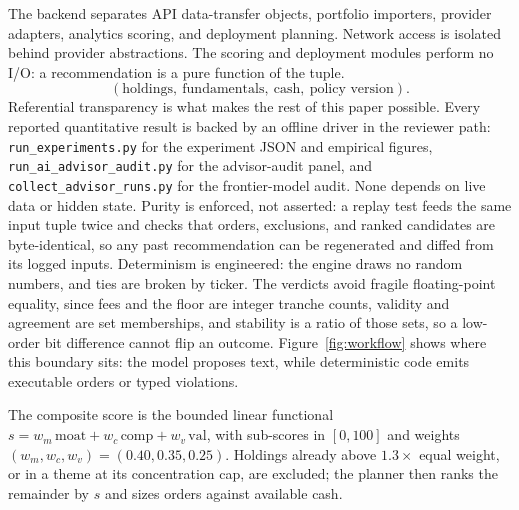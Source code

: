 \documentclass[sigconf,review,anonymous]{acmart}
\begin{document}
The backend separates API data-transfer objects, portfolio importers, provider adapters, analytics scoring, and deployment planning. Network access is isolated behind provider abstractions. The scoring and deployment modules perform no I/O: a recommendation is a pure function of the tuple.
\[
(\text{holdings},\ \text{fundamentals},\ \text{cash},\ \text{policy version}).
\]
Referential transparency is what makes the rest of this paper possible. Every reported quantitative result is backed by an offline driver in the reviewer path: \texttt{run\_experiments.py} for the experiment JSON and empirical figures, \texttt{run\_ai\_advisor\_audit.py} for the advisor-audit panel, and \texttt{collect\_advisor\_runs.py} for the frontier-model audit. None depends on live data or hidden state. Purity is enforced, not asserted: a replay test feeds the same input tuple twice and checks that orders, exclusions, and ranked candidates are byte-identical, so any past recommendation can be regenerated and diffed from its logged inputs. Determinism is engineered: the engine draws no random numbers, and ties are broken by ticker. The verdicts avoid fragile floating-point equality, since fees and the floor are integer tranche counts, validity and agreement are set memberships, and stability is a ratio of those sets, so a low-order bit difference cannot flip an outcome. Figure~\ref{fig:workflow} shows where this boundary sits: the model proposes text, while deterministic code emits executable orders or typed violations.

The composite score is the bounded linear functional $s=w_m\,\mathrm{moat}+w_c\,\mathrm{comp}+w_v\,\mathrm{val}$, with sub-scores in $[0,100]$ and weights $(w_m,w_c,w_v)=(0.40,0.35,0.25)$. Holdings already above $1.3\times$ equal weight, or in a theme at its concentration cap, are excluded; the planner then ranks the remainder by $s$ and sizes orders against available cash.
\end{document}
